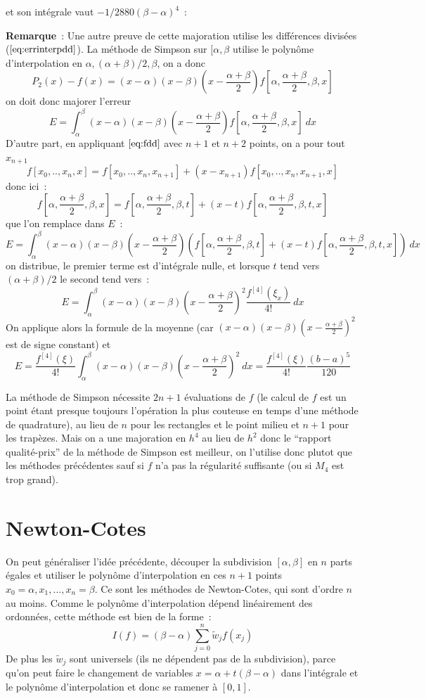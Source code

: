 \documentclass[a4paper,11pt]{book}
\begin{document}
\begin{giacjshere}
et son int\'egrale vaut $-1/2880(\beta-\alpha)^4$~:\\

{\bf Remarque}~: Une autre preuve de cette majoration utilise les
diff\'erences divis\'ees (\(\ref{eq:errinterpdd}\)).
La m\'ethode de Simpson sur $[\alpha,\beta$ 
utilise le polyn\^ome d'interpolation en 
$\alpha, (\alpha+\beta)/2, \beta$, on a donc
$$ P_2(x)-f(x)=(x-\alpha)(x-\beta) (x-\frac{\alpha+\beta}{2})
f[\alpha,\frac{\alpha+\beta}{2},\beta,x]$$
on doit donc majorer l'erreur
$$ E=\int_\alpha^\beta (x-\alpha)(x-\beta) (x-\frac{\alpha+\beta}{2})
f[\alpha,\frac{\alpha+\beta}{2},\beta,x] \ dx $$
D'autre part, en appliquant \(\ref{eq:fdd}\) avec $n+1$ et $n+2$ points, on a
pour tout $x_{n+1}$
$$ f[x_0,..,x_n,x]=f[x_0,..,x_n,x_{n+1}]+(x-x_{n+1})f[x_0,..,x_n,x_{n+1},x]$$
donc ici~:
$$ f[\alpha,\frac{\alpha+\beta}{2},\beta,x]=f[\alpha,\frac{\alpha+\beta}{2},\beta,t]+(x-t)f[\alpha,\frac{\alpha+\beta}{2},\beta,t,x]$$
que l'on remplace dans $E$~:
$$ E=\int_\alpha^\beta (x-\alpha)(x-\beta) (x-\frac{\alpha+\beta}{2})
(f[\alpha,\frac{\alpha+\beta}{2},\beta,t]
+(x-t)
f[\alpha,\frac{\alpha+\beta}{2},\beta,t,x]) \ dx$$
on distribue, le premier terme est d'int\'egrale nulle,
et lorsque $t$ tend vers $(\alpha+\beta)/2$ le second
tend vers~:
$$ E=\int_\alpha^\beta (x-\alpha)(x-\beta) (x-\frac{\alpha+\beta}{2})^2 
\frac{f^{[4]}(\xi_x)}{4!} \ dx$$
On applique alors la formule de la moyenne 
(car $(x-\alpha)(x-\beta) (x-\frac{\alpha+\beta}{2})^2$ est de signe constant)
et
$$ E=\frac{f^{[4]}(\xi)}{4!} 
\int_\alpha^\beta (x-\alpha)(x-\beta) (x-\frac{\alpha+\beta}{2})^2 \ dx
= \frac{f^{[4]}(\xi)}{4!} \frac{(b-a)^5}{120}$$

La m\'ethode de Simpson n\'ecessite $2n+1$ \'evaluations de $f$ (le calcul
de $f$ est un point \'etant presque toujours 
l'op\'eration la plus couteuse en temps d'une
m\'ethode de quadrature), au lieu de $n$ pour les rectangles
et le point milieu et $n+1$ pour les trap\`ezes. Mais on a une majoration
en $h^4$ au lieu de $h^2$ donc le ``rapport qualit\'e-prix'' de la m\'ethode
de Simpson est meilleur, on l'utilise donc plutot que les
m\'ethodes pr\'ec\'edentes sauf si $f$ n'a pas la r\'egularit\'e
suffisante (ou si $M_4$ est trop grand).

 \section{Newton-Cotes} 
On peut g\'en\'eraliser l'id\'ee pr\'ec\'edente, d\'ecouper la subdivision 
$[\alpha,\beta]$ en $n$ parts \'egales et utiliser le polynôme d'interpolation
en ces $n+1$ points $x_0=\alpha, x_1, ..., x_n=\beta$. 
Ce sont les m\'ethodes de Newton-Cotes,
qui sont d'ordre $n$ au moins. Comme le polyn\^ome d'interpolation
d\'epend lin\'eairement des ordonn\'ees, cette m\'ethode est bien
de la forme~:
\[ I(f)=(\beta-\alpha)\sum_{j=0}^n \tilde{w}_j f(x_j)\]
De plus les $\tilde{w}_j$ sont universels (ils ne d\'ependent pas de 
la subdivision), parce qu'on peut faire 
le changement de variables $x=\alpha+t(\beta-\alpha)$ dans l'int\'egrale
et le polyn\^ome d'interpolation et donc se ramener \`a $[0,1]$.


\end{giacjshere}
\end{document}
